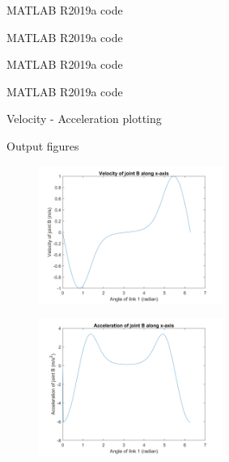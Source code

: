 \begin{frame}{MATLAB R2019a code}

\end{frame}
\begin{frame}{MATLAB R2019a code}

\end{frame}
\begin{frame}{MATLAB R2019a code}

\end{frame}
\begin{frame}{MATLAB R2019a code}

\end{frame}
\begin{frame}{Velocity - Acceleration plotting}

\end{frame}
\begin{frame}{Output figures}
\begin{table}
\begin{minipage}{0.5\linewidth}
	\begin{figure}
		\centering
		\includegraphics[width=60mm]{images/v_iRRRT.png}
	\end{figure}
\end{minipage}\hfill
\begin{minipage}{0.5\linewidth}
	\begin{figure}
		\centering
		\includegraphics[width=60mm]{images/a_iRRRT.png}
	\end{figure}
\end{minipage}
\end{table}
\end{frame}